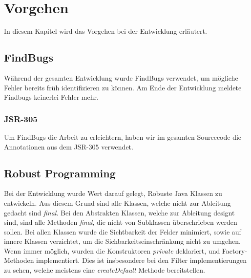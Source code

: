\section{Vorgehen}

In diesem Kapitel wird das Vorgehen bei der Entwicklung erläutert.

\subsection{FindBugs}

Während der gesamten Entwicklung wurde FindBugs verwendet, um mögliche Fehler bereits 
früh identifizieren zu können. Am Ende der Entwicklung meldete Findbugs keinerlei Fehler mehr.

\subsubsection{JSR-305}

Um FindBugs die Arbeit zu erleichtern, haben wir im gesamten Sourcecode die Annotationen aus dem JSR-305 
verwendet.
\subsection{Robust Programming}

Bei der Entwicklung wurde Wert darauf gelegt, Robuste Java Klassen zu entwickeln. Aus diesem Grund 
sind alle Klassen, welche nicht zur Ableitung gedacht sind \textit{final}. Bei den Abstrakten Klassen,
welche zur Ableitung designt sind, sind alle Methoden \textit{final}, die nicht von Subklassen überschrieben
werden sollen. Bei allen Klassen wurde die Sichtbarkeit der Felder minimiert, sowie auf innere Klassen 
verzichtet, um die Sichbarkeitseinschränkung nicht zu umgehen. Wenn immer möglich, wurden die 
Konstruktoren \textit{private} deklariert, und Factory-Methoden implementiert. Dies ist insbesondere
bei den Filter implementierungen zu sehen, welche meistens eine \textit{createDefault} Methode 
bereitstellen.\newline

